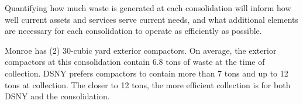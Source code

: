 
    Quantifying how much waste is generated at each consolidation will inform how well current assets and services serve current needs, and what additional elements are necessary for each consolidation to operate as efficiently as possible.
    
    Monroe has (2) 30-cubic yard exterior compactors. On average, the exterior compactors at this consolidation contain 6.8 tons of waste at the time of collection. DSNY prefers compactors to contain more than 7 tons and up to 12 tons at collection. The closer to 12 tons, the more efficient collection is for both DSNY and the consolidation.